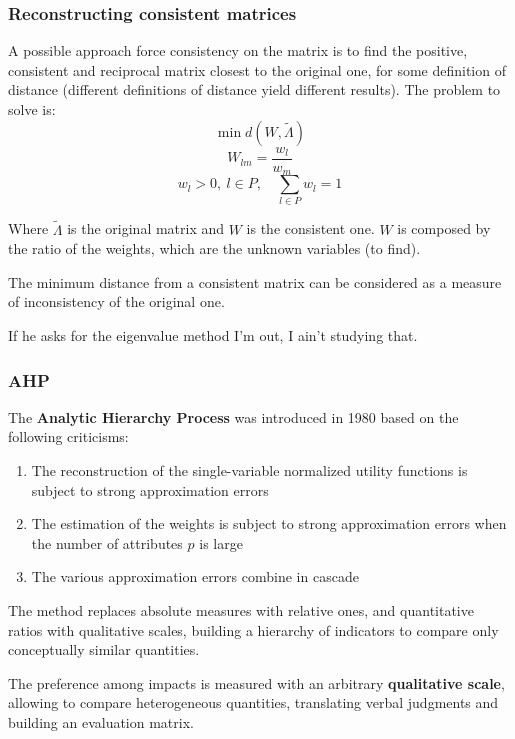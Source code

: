 \subsubsection{Reconstructing consistent matrices}

A possible approach force consistency on the matrix is to find the positive, consistent and reciprocal matrix closest to the original one, for some definition of distance (different definitions of distance yield different results). The problem to solve is: 
$$ \min d \left(W, \tilde \Lambda \right)$$
$$ W_{lm} = \frac{w_l}{w_m} $$
$$ w_l > 0, \ l \in P, \quad \sum_{l \in P} w_l = 1$$

Where $\tilde \Lambda$ is the original matrix and $W$ is the consistent one. $W$ is composed by the ratio of the weights, which are the unknown variables (to find).

The minimum distance from a consistent matrix can be considered as a measure of inconsistency of the original one.

If he asks for the eigenvalue method I'm out, I ain't studying that.

\subsubsection{AHP}

The \textbf{Analytic Hierarchy Process} was introduced in 1980 based on the following criticisms:
\begin{enumerate}
	\item The reconstruction of the single-variable normalized utility functions is subject to strong approximation errors
	
	\item The estimation of the weights is subject to strong approximation errors when the number of attributes $p$ is large
	
	\item The various approximation errors combine in cascade
\end{enumerate}

The method replaces absolute measures with relative ones, and quantitative ratios with qualitative scales, building a hierarchy of indicators to compare only conceptually similar quantities.

The preference among impacts is measured with an arbitrary \textbf{qualitative scale}, allowing to compare heterogeneous quantities, translating verbal judgments and building an evaluation matrix. 

